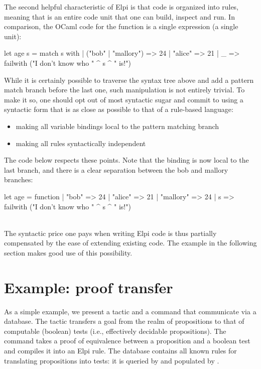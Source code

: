 \documentclass{these-ISSS}
\newenvironment{ocamlcode}
  {\VerbatimEnvironment\begin{ocamlbox}\begin{xocamlcode}}{\end{xocamlcode}
\end{ocamlbox}}
\begin{document}
The second helpful characteristic of Elpi is that code is organized into rules,
meaning that  is an entire code unit that one can build,
inspect and run. In comparison, the OCaml code for the  function is a
single expression (a single unit):

\begin{ocamlcode}
let age s =
  match s with
  | ("bob" | "mallory") => 24
  | "alice" => 21
  | _ => failwith ("I don't know who " ^ s ^ " is!")
\end{ocamlcode}


While it is certainly possible to traverse the syntax tree above and add a
pattern match branch before the last one, such manipulation is not entirely
trivial. To make it so, one should opt out of most syntactic sugar and commit
to using a syntactic form that is as close as possible to that of a rule-based
language:
\begin{itemize}
  \item making all variable bindings local to the pattern matching branch
  \item making all rules syntactically independent
\end{itemize}


The code below respects these points. Note that the  binding is now
local to the last branch, and there is a clear separation between the bob and
mallory branches:

\begin{ocamlcode}
let age = function
  | "bob" => 24
  | "alice" => 21
  | "mallory" => 24
  | s => failwith ("I don't know who " ^ s ^ " is!")
\end{ocamlcode}
  
~\\
The syntactic price one pays when writing Elpi code is thus partially
compensated by the ease of extending existing code. The example in the
following section makes good use of this possibility.

\section{Example: proof transfer}\label{sec:tb}


As a simple example, we present a tactic and a command that communicate via a
database. The tactic  transfers a goal from the realm of
propositions to that of computable (boolean) tests (i.e., effectively decidable
propositions). The command  takes a proof of
equivalence between a proposition and a boolean test and compiles it into an
Elpi rule. The database contains all known rules for translating propositions
into tests: it is queried by  and populated by
.
\end{document}
